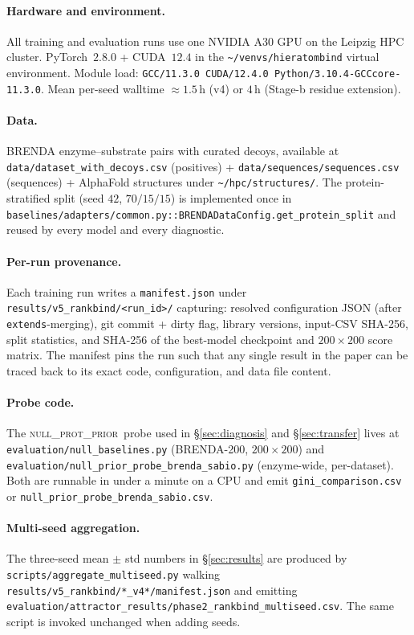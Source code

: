 \documentclass[11pt,a4paper]{article}
\newcommand{\nullprior}{\textsc{null\_prot\_prior}\xspace}
\begin{document}
\paragraph{Hardware and environment.}
All training and evaluation runs use one NVIDIA A30 GPU on the
Leipzig HPC cluster. PyTorch~$2.8.0$ + CUDA~$12.4$ in the
\texttt{\textasciitilde/venvs/hieratombind} virtual environment.
Module load: \texttt{GCC/11.3.0 CUDA/12.4.0 Python/3.10.4-GCCcore-11.3.0}.
Mean per-seed walltime $\approx 1.5$\,h (v4) or $4$\,h (Stage-b
residue extension).

\paragraph{Data.}
BRENDA enzyme--substrate pairs with curated decoys, available at
\texttt{data/dataset\_with\_decoys.csv} (positives) +
\texttt{data/sequences/sequences.csv} (sequences) + AlphaFold
structures under \texttt{\textasciitilde/hpc/structures/}. The
protein-stratified split (seed $42$, $70/15/15$) is implemented once
in
\texttt{baselines/adapters/common.py::BRENDADataConfig.get\_protein\_split}
and reused by every model and every diagnostic.

\paragraph{Per-run provenance.}
Each training run writes a \texttt{manifest.json} under
\texttt{results/v5\_rankbind/<run\_id>/} capturing: resolved
configuration JSON (after \texttt{extends}-merging), git commit + dirty
flag, library versions, input-CSV SHA-256, split statistics, and
SHA-256 of the best-model checkpoint and $200 \times 200$ score
matrix. The manifest pins the run such that any single result in the
paper can be traced back to its exact code, configuration, and data
file content.

\paragraph{Probe code.}
The \nullprior\ probe used in \S\ref{sec:diagnosis} and
\S\ref{sec:transfer} lives at \texttt{evaluation/null\_baselines.py}
(BRENDA-200, $200 \times 200$) and
\texttt{evaluation/null\_prior\_probe\_brenda\_sabio.py} (enzyme-wide,
per-dataset). Both are runnable in under a minute on a CPU and emit
\texttt{gini\_comparison.csv} or
\texttt{null\_prior\_probe\_brenda\_sabio.csv}.

\paragraph{Multi-seed aggregation.}
The three-seed mean $\pm$ std numbers in \S\ref{sec:results} are
produced by \texttt{scripts/aggregate\_multiseed.py} walking
\texttt{results/v5\_rankbind/*\_v4*/manifest.json} and emitting
\texttt{evaluation/attractor\_results/phase2\_rankbind\_multiseed.csv}.
The same script is invoked unchanged when adding seeds.
\end{document}
